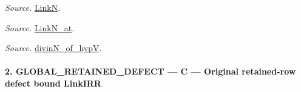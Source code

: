 \emph{Source.} \href{https://github.com/CocoSgt/riemann-hypothesis-lean/blob/7cbf7a0c32fca1badf05931879a37c3f8a2b03b4/src/Formalism/SharpRestriction/GlobalTheoremInputs.lean#L45-L48}{LinkN}.

\emph{Source.} \href{https://github.com/CocoSgt/riemann-hypothesis-lean/blob/7cbf7a0c32fca1badf05931879a37c3f8a2b03b4/src/Formalism/SharpRestriction/GlobalTheoremInputs.lean#L40-L44}{LinkN\_\allowbreak at}.

\emph{Source.} \href{https://github.com/CocoSgt/riemann-hypothesis-lean/blob/7cbf7a0c32fca1badf05931879a37c3f8a2b03b4/src/Development/AutomorphicArithmetic/CharacterBoxes/DivinNOfHypV.lean#L117-L134}{divinN\_\allowbreak of\_\allowbreak hypV}.



\paragraph{2. GLOBAL\_\allowbreak RETAINED\_\allowbreak DEFECT — C — Original retained-row defect bound LinkIRR}

